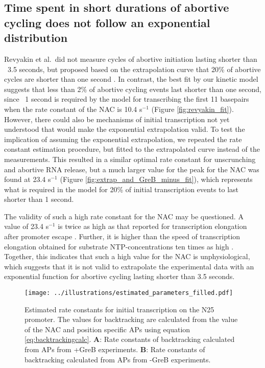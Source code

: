 \subsection{Time spent in short durations of abortive cycling does not follow
    an exponential distribution}
Revyakin et al.\ did not measure cycles of abortive initiation lasting shorter
than ~3.5 seconds, but proposed based on the extrapolation curve that 20\% of
abortive cycles are shorter than one second \cite{revyakin_abortive_2006}. In
contrast, the best fit by our kinetic model suggests that
less than 2\% of abortive cycling events last shorter than one second, since
~1 second is required by the model for transcribing the first 11 basepairs
when the rate constant of the NAC is 10.4 s$^{-1}$ (Figure
\ref{fig:revyakin_fit}). However, there could also be mechanisms of initial
transcription not yet understood that would make the exponential extrapolation
valid. To test the implication of assuming the exponential extrapolation, we
repeated the rate constant estimation procedure, but fitted to the
extrapolated curve instead of the measurements. This resulted in a similar
optimal rate constant for unscrunching and abortive RNA release, but a much
larger value for the peak for the NAC was found at 23.4 s$^{-1}$ (Figure
\ref{fig:extrap_and_GreB_minus_fit}), which represents what is required in the
model for 20\% of initial transcription events to last shorter than 1 second.

The validity of such a high rate constant for the NAC may be questioned. A
value of 23.4 s$^{-1}$ is twice as high as that reported for transcription
elongation after promoter escape \cite{revyakin_abortive_2006}. Further, it is
higher than the speed of transcription elongation obtained for substrate
NTP-concentrations ten times as high \cite{bai_mechanochemical_2007}.
Together, this indicates that such a high value for the NAC is
unphysiological, which suggests that it is not valid to extrapolate the
experimental data with an exponential function for abortive cycling lasting
shorter than 3.5 seconds.

\begin{figure}
	\begin{center}
      \texttt{[image: ../illustrations/estimated\_parameters\_filled.pdf]}
	\end{center}
    \caption{Estimated rate constants for initial transcription on the N25
        promoter. The values for backtracking are calculated from the value of
        the NAC and position specific APs using equation
        \eqref{eq:backtrackingcalc}. \textbf{A}: Rate constants of
        backtracking calculated from APs from +GreB experiments. \textbf{B}:
        Rate constants of backtracking calculated from APs from -GreB
        experiments.}
    \label{fig:estimated_parameters}
\end{figure}

